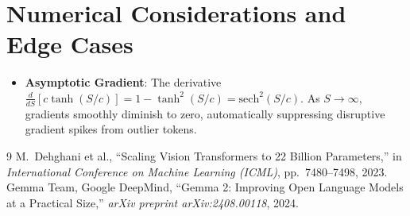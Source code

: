 \documentclass[11pt,a4paper]{article}
\theoremstyle{definition}
\begin{document}
\section{Numerical Considerations and Edge Cases}

\begin{itemize}
    \item \textbf{Asymptotic Gradient}: The derivative $\frac{d}{dS}[c \tanh(S/c)] = 1 - \tanh^2(S/c) = \text{sech}^2(S/c)$. As $S \to \infty$, gradients smoothly diminish to zero, automatically suppressing disruptive gradient spikes from outlier tokens.
\end{itemize}

\begin{thebibliography}{9}
 M.~Dehghani et al., ``Scaling Vision Transformers to 22 Billion Parameters,'' in \emph{International Conference on Machine Learning (ICML)}, pp.~7480--7498, 2023.
 Gemma Team, Google DeepMind, ``Gemma 2: Improving Open Language Models at a Practical Size,'' \emph{arXiv preprint arXiv:2408.00118}, 2024.
\end{thebibliography}
\end{document}
